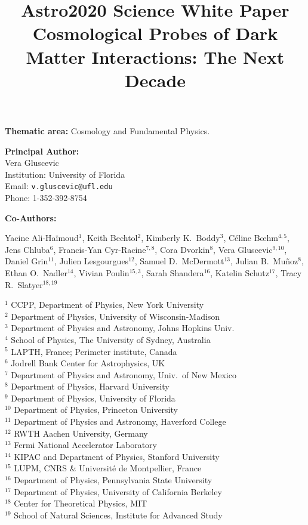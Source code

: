 \documentclass[12pt]{article}
\title{{Astro2020 Science White Paper}\\
\vspace{0.5cm}
\bf{Cosmological Probes of Dark Matter Interactions: The Next Decade}}
\date{}
\author{}
\begin{document}
\maketitle
\vspace{-2cm}
\begin{center}
\textbf{Thematic area:} Cosmology and Fundamental Physics.     
\end{center}

\noindent\textbf{Principal Author:} \\
Vera Gluscevic\\
Institution: University of Florida\\
Email: \texttt{v.gluscevic@ufl.edu}\\
Phone: 1-352-392-8754

\vspace{0.5cm}
\noindent\textbf{Co-Authors:}

\noindent 
{Yacine Ali-Ha\"imoud$^{1}$, Keith Bechtol$^{2}$, Kimberly K.~Boddy$^{3}$, C\'eline B\oe{}hm$^{4,5}$, Jens Chluba$^{6}$, Francis-Yan Cyr-Racine$^{7,8}$, Cora Dvorkin$^{8}$, Vera Gluscevic$^{9,10}$, Daniel Grin$^{11}$, Julien Lesgourgues$^{12}$, Samuel D.~McDermott$^{13}$, Julian B.~Mu\~noz$^{8}$, Ethan O.~Nadler$^{14}$, Vivian Poulin$^{15,3}$, Sarah Shandera$^{16}$, Katelin Schutz$^{17}$, Tracy R.~Slatyer$^{18,19}$}

\def\affil#1{\noindent #1 \\}

\begin{multicols}{2}
\scriptsize
\affil{$^{1}$ CCPP, Department of Physics, New York University}
\affil{$^{2}$ Department of Physics, University of Wisconsin-Madison}
\affil{$^{3}$ Department of Physics and Astronomy, Johns Hopkins Univ.}
\affil{$^{4}$ School of Physics, The University of Sydney, Australia}
\affil{$^{5}$ LAPTH, France; Perimeter institute, Canada}
\affil{$^{6}$ Jodrell Bank Center for Astrophysics, UK}
\affil{$^{7}$ Department of Physics and Astronomy, Univ.~of New Mexico}
\affil{$^{8}$ Department of Physics, Harvard University}
\affil{$^{9}$ Department of Physics, University of Florida}
\affil{$^{10}$ Department of Physics, Princeton University}
\affil{$^{11}$ Department of Physics and Astronomy, Haverford College}
\affil{$^{12}$ RWTH Aachen University, Germany}
\affil{$^{13}$ Fermi National Accelerator Laboratory}
\affil{$^{14}$ KIPAC and Department of Physics, Stanford University}
\affil{$^{15}$ LUPM, CNRS \& Universit\'e de Montpellier, France}
\affil{$^{16}$ Department of Physics, Pennsylvania State University}
\affil{$^{17}$ Department of Physics, University of California Berkeley}
\affil{$^{18}$ Center for Theoretical Physics, MIT}
\affil{$^{19}$ School of Natural Sciences, Institute for Advanced Study}


\normalsize
\end{multicols}
\end{document}
